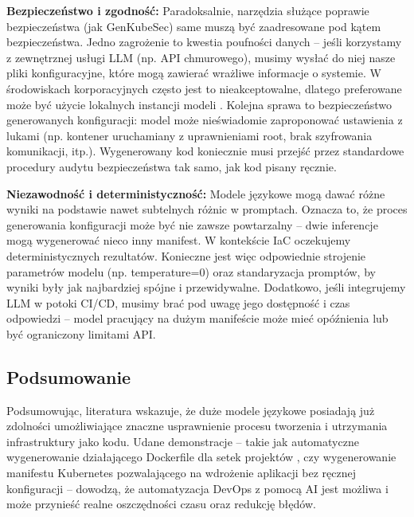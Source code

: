\textbf{Bezpieczeństwo i zgodność:} Paradoksalnie, narzędzia służące poprawie bezpieczeństwa (jak GenKubeSec) same muszą być zaadresowane pod kątem bezpieczeństwa. Jedno zagrożenie to kwestia poufności danych – jeśli korzystamy z zewnętrznej usługi LLM (np. API chmurowego), musimy wysłać do niej nasze pliki konfiguracyjne, które mogą zawierać wrażliwe informacje o systemie. W środowiskach korporacyjnych często jest to nieakceptowalne, dlatego preferowane może być użycie lokalnych instancji modeli \cite{malul_genkubesec_2024}. Kolejna sprawa to bezpieczeństwo generowanych konfiguracji: model może nieświadomie zaproponować ustawienia z lukami (np. kontener uruchamiany z uprawnieniami root, brak szyfrowania komunikacji, itp.). Wygenerowany kod koniecznie musi przejść przez standardowe procedury audytu bezpieczeństwa tak samo, jak kod pisany ręcznie.

\textbf{Niezawodność i deterministyczność:} Modele językowe mogą dawać różne wyniki na podstawie nawet subtelnych różnic w promptach. Oznacza to, że proces generowania konfiguracji może być nie zawsze powtarzalny – dwie inferencje mogą wygenerować nieco inny manifest. W kontekście IaC oczekujemy deterministycznych rezultatów. Konieczne jest więc odpowiednie strojenie parametrów modelu (np. temperature=0) oraz standaryzacja promptów, by wyniki były jak najbardziej spójne i przewidywalne. Dodatkowo, jeśli integrujemy LLM w potoki CI/CD, musimy brać pod uwagę jego dostępność i czas odpowiedzi – model pracujący na dużym manifeście może mieć opóźnienia lub być ograniczony limitami API.

\subsection{Podsumowanie}

Podsumowując, literatura wskazuje, że duże modele językowe posiadają już zdolności umożliwiające znaczne usprawnienie procesu tworzenia i utrzymania infrastruktury jako kodu. Udane demonstracje – takie jak automatyczne wygenerowanie działającego Dockerfile dla setek projektów \cite{hu_llm-based_2025}, czy wygenerowanie manifestu Kubernetes pozwalającego na wdrożenie aplikacji bez ręcznej konfiguracji \cite{kratzke_dont_2024} – dowodzą, że automatyzacja DevOps z pomocą AI jest możliwa i może przynieść realne oszczędności czasu oraz redukcję błędów.

